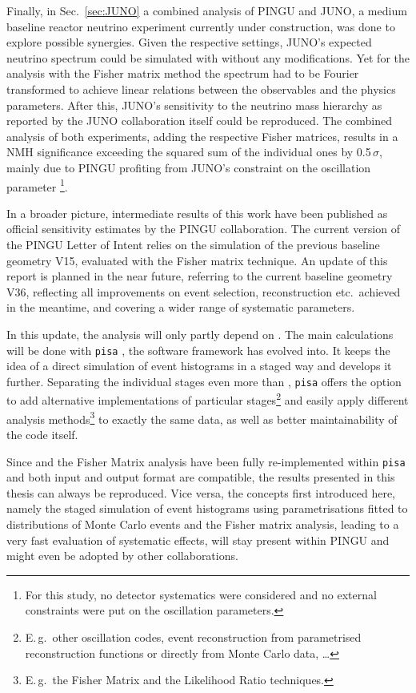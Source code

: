 Finally, in Sec.~\ref{sec:JUNO} a combined analysis of PINGU and JUNO, a medium
baseline reactor neutrino experiment currently under construction, was done to
explore possible synergies. Given the respective settings, JUNO's expected
neutrino spectrum could be simulated with \papa without any modifications. Yet
for the analysis with the Fisher matrix method the spectrum had to be Fourier
transformed to achieve linear relations between the observables and the physics
parameters. After this, JUNO's sensitivity to the neutrino mass hierarchy as
reported by the JUNO collaboration itself could be reproduced. The combined
analysis of both experiments, \ie adding the respective Fisher matrices,
results in a NMH significance exceeding the squared sum of the individual ones
by 0.5\,$\sigma$, mainly due to PINGU profiting from JUNO's constraint on the
oscillation parameter \footnote{For this study, no detector systematics
were considered and no external constraints were put on the oscillation
parameters.}.

In a broader picture, intermediate results of this work have been published as
official sensitivity estimates by the PINGU collaboration. The current version
of the PINGU Letter of Intent \cite{LoI} relies on the \papa simulation of the
previous baseline geometry V15, evaluated with the Fisher matrix technique. An
update of this report is planned in the near future, referring to the
current baseline geometry V36, reflecting all improvements on event
selection, reconstruction etc.\ achieved in the meantime, and covering a wider
range of systematic parameters.

In this update, the analysis will only partly depend on \papa. The main
calculations will be done with \texttt{pisa} \cite{pisa}, the software framework
\papa has evolved into. It keeps the idea of a direct simulation of event
histograms in a staged way and develops it further. Separating the individual
stages even more than \papa, \texttt{pisa} offers the option to add alternative
implementations of particular stages\footnote{E.\,g.\ other oscillation codes,
event reconstruction from parametrised reconstruction functions or directly
from Monte Carlo data, \dots} and easily apply different analysis
methods\footnote{E.\,g.\ the Fisher Matrix and the Likelihood Ratio techniques.}
to exactly the same data, as well as better maintainability of the code itself.

Since \papa and the Fisher Matrix analysis have been fully re-implemented
within \texttt{pisa} and both input and output format are compatible, the
results presented in this thesis can always be reproduced. Vice versa, the
concepts first introduced here, namely the staged simulation of event
histograms using parametrisations fitted to distributions of Monte Carlo events
and the Fisher matrix analysis, leading to a very fast evaluation of systematic
effects, will stay present within PINGU and might even be adopted by other
collaborations.